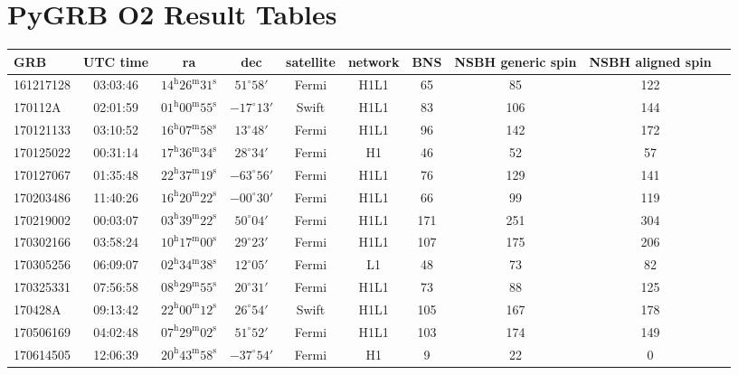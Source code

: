 \documentclass[11pt]{cuthesis}
\begin{document}
\chapter{PyGRB O2 Result Tables} \label{tab:grbs}
\begin{landscape}
\begin{tabular}{l c  c  c  c  c  c  c  c c |}
\hline
 GRB & UTC time & ra & dec & satellite & network & BNS & NSBH generic spin & NSBH aligned spin \\
\hline
161217128 & 03:03:46  & $14^{\mathrm{h}}26^{\mathrm{m}}31^{\mathrm{s}}$ & $51^{\circ}58'$ &  Fermi   & H1L1   & 65  & 85  & 122 \\
170112A   & 02:01:59  & $01^{\mathrm{h}}00^{\mathrm{m}}55^{\mathrm{s}}$ & $-17^{\circ}13'$ & Swift   & H1L1   & 83  & 106 & 144 \\
170121133 & 03:10:52  & $16^{\mathrm{h}}07^{\mathrm{m}}58^{\mathrm{s}}$ & $13^{\circ}48'$ &  Fermi   & H1L1   & 96  & 142 & 172 \\
170125022 & 00:31:14  & $17^{\mathrm{h}}36^{\mathrm{m}}34^{\mathrm{s}}$ & $28^{\circ}34'$ &  Fermi   & H1     & 46  & 52  & 57 \\
170127067 & 01:35:48  & $22^{\mathrm{h}}37^{\mathrm{m}}19^{\mathrm{s}}$ & $-63^{\circ}56'$ & Fermi   & H1L1   & 76  & 129 & 141 \\
170203486 & 11:40:26  & $16^{\mathrm{h}}20^{\mathrm{m}}22^{\mathrm{s}}$ & $-00^{\circ}30'$ & Fermi   & H1L1   & 66  & 99  & 119 \\
170219002 & 00:03:07  & $03^{\mathrm{h}}39^{\mathrm{m}}22^{\mathrm{s}}$ & $50^{\circ}04'$ &  Fermi   & H1L1   & 171 & 251 & 304 \\
170302166 & 03:58:24  & $10^{\mathrm{h}}17^{\mathrm{m}}00^{\mathrm{s}}$ & $29^{\circ}23'$ &  Fermi   & H1L1   & 107 & 175 & 206 \\
170305256 & 06:09:07  & $02^{\mathrm{h}}34^{\mathrm{m}}38^{\mathrm{s}}$ & $12^{\circ}05'$ &  Fermi   & L1     & 48  & 73  & 82 \\
170325331 & 07:56:58  & $08^{\mathrm{h}}29^{\mathrm{m}}55^{\mathrm{s}}$ & $20^{\circ}31'$ &  Fermi   & H1L1   & 73  & 88  & 125 \\
170428A   & 09:13:42  & $22^{\mathrm{h}}00^{\mathrm{m}}12^{\mathrm{s}}$ & $26^{\circ}54'$ &  Swift   & H1L1   & 105 & 167 & 178 \\
170506169 & 04:02:48  & $07^{\mathrm{h}}29^{\mathrm{m}}02^{\mathrm{s}}$ & $51^{\circ}52'$ &  Fermi   & H1L1   & 103 & 174 & 149 \\
170614505 & 12:06:39  & $20^{\mathrm{h}}43^{\mathrm{m}}58^{\mathrm{s}}$ & $-37^{\circ}54'$ & Fermi   & H1     & 9   & 22  & 0 \\

\end{tabular}
\end{landscape}
\end{document}

